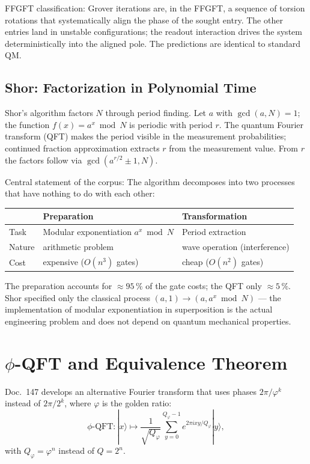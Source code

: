 FFGFT classification: Grover iterations are, in the FFGFT, a sequence of
torsion rotations that systematically align the phase of the sought entry. The other entries land in unstable configurations;
the readout interaction drives the system deterministically into the
aligned pole. The predictions are identical to
standard QM.

\subsection*{Shor: Factorization in Polynomial Time}

Shor's algorithm factors $N$ through period finding. Let $a$ with
$\gcd(a,N) = 1$; the function $f(x) = a^x\bmod N$ is periodic with
period $r$. The quantum Fourier transform (QFT) makes the period visible in
the measurement probabilities; continued fraction approximation extracts
$r$ from the measurement value. From $r$ the factors follow via $\gcd(a^{r/2}\pm1, N)$.

Central statement of the corpus: The algorithm decomposes into two processes
that have nothing to do with each other:

\begin{center}
\small
\begin{tabular}{p{2cm}p{3cm}p{3cm}}
\toprule
 & \textbf{Preparation} & \textbf{Transformation} \\
\midrule
Task & Modular exponentiation $a^x\bmod N$ & Period extraction \\
Nature & arithmetic problem & wave operation (interference) \\
Cost & expensive ($O(n^3)$ gates) & cheap ($O(n^2)$ gates) \\
\bottomrule
\end{tabular}
\end{center}

The preparation accounts for $\approx95\,\%$ of the gate costs; the QFT only
$\approx5\,\%$. Shor specified only the classical process
$(a,1)\to(a,a^x\bmod N)$ --- the implementation of modular
exponentiation in superposition is the actual engineering problem and
does not depend on quantum mechanical properties.

\section{$\phi$-QFT and Equivalence Theorem}

Doc.~147 develops an alternative Fourier transform that uses phases
$2\pi/\varphi^k$ instead of $2\pi/2^k$, where $\varphi$ is the
golden ratio:
\begin{equation}
  \phi\text{-QFT}:|x\rangle\mapsto
  \frac{1}{\sqrt{Q_\varphi}}
  \sum_{y=0}^{Q_\varphi-1}e^{2\pi ixy/Q_\varphi}|y\rangle,
\end{equation}
with $Q_\varphi = \varphi^n$ instead of $Q = 2^n$.

